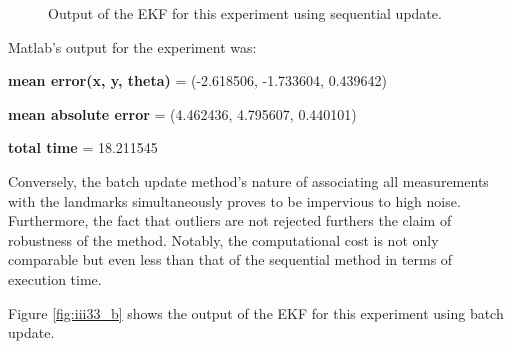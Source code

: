 \begin{figure}[H]
	\scalebox{0.6}{}
	\scalebox{0.6}{}

	\centering
	\centerline{}

	\caption{Output of the EKF for this experiment using sequential update.}
	\label{fig:iii33_s}
\end{figure}

Matlab's output for the experiment was:

\textbf{mean error(x, y, theta)} = (-2.618506, -1.733604, 0.439642)

\textbf{mean absolute error} = (4.462436, 4.795607, 0.440101)

\textbf{total time} = 18.211545


Conversely, the batch update method's nature of associating all measurements with the landmarks simultaneously
proves to be impervious to high noise. Furthermore, the fact that outliers are not rejected furthers the claim of robustness of the method.
Notably, the computational cost is not only comparable but even less than that of the sequential method in terms of execution time.

Figure \ref{fig:iii33_b} shows the output of the EKF for this experiment using batch update.

